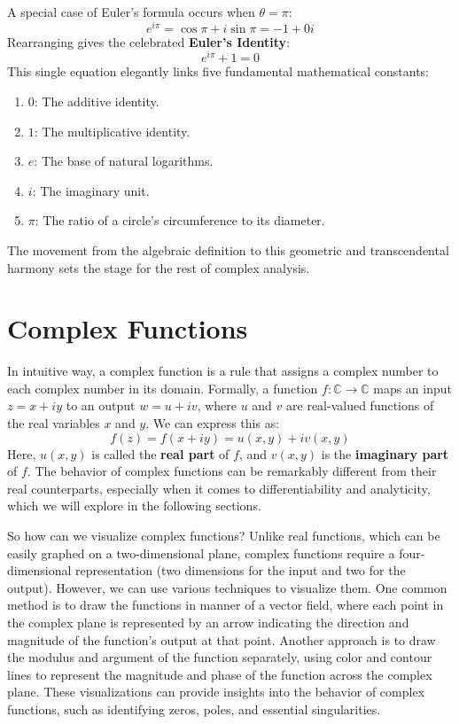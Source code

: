 A special case of Euler's formula occurs when $\theta = \pi$:
\begin{equation}
    e^{i\pi} = \cos \pi + i\sin \pi = -1 + 0i
\end{equation}
Rearranging gives the celebrated \textbf{Euler's Identity}:
\begin{equation}
    e^{i\pi} + 1 = 0
\end{equation}
This single equation elegantly links five fundamental mathematical constants:
\begin{enumerate}
    \item \textbf{$0$}: The additive identity.
    \item \textbf{$1$}: The multiplicative identity.
    \item \textbf{$e$}: The base of natural logarithms.
    \item \textbf{$i$}: The imaginary unit.
    \item \textbf{$\pi$}: The ratio of a circle's circumference to its diameter.
\end{enumerate}
The movement from the algebraic definition to this geometric and transcendental harmony sets the stage for the rest of complex analysis.

\section{Complex Functions}

In intuitive way, a complex function is a rule that assigns a complex number to each complex number in its domain. Formally, a function $f: \mathbb{C} \to \mathbb{C}$ maps an input $z = x + iy$ to an output $w = u + iv$, where $u$ and $v$ are real-valued functions of the real variables $x$ and $y$. We can express this as:
\begin{equation}
    f(z) = f(x + iy) = u(x, y) + iv(x, y)
\end{equation}
Here, $u(x, y)$ is called the \textbf{real part} of $f$, and $v(x, y)$ is the \textbf{imaginary part} of $f$. The behavior of complex functions can be remarkably different from their real counterparts, especially when it comes to differentiability and analyticity, which we will explore in the following sections.

So how can we visualize complex functions? Unlike real functions, which can be easily graphed on a two-dimensional plane, complex functions require a four-dimensional representation (two dimensions for the input and two for the output). However, we can use various techniques to visualize them. One common method is to draw the functions in manner of a vector field, where each point in the complex plane is represented by an arrow indicating the direction and magnitude of the function's output at that point. Another approach is to draw the modulus and argument of the function separately, using color and contour lines to represent the magnitude and phase of the function across the complex plane. These visualizations can provide insights into the behavior of complex functions, such as identifying zeros, poles, and essential singularities.

